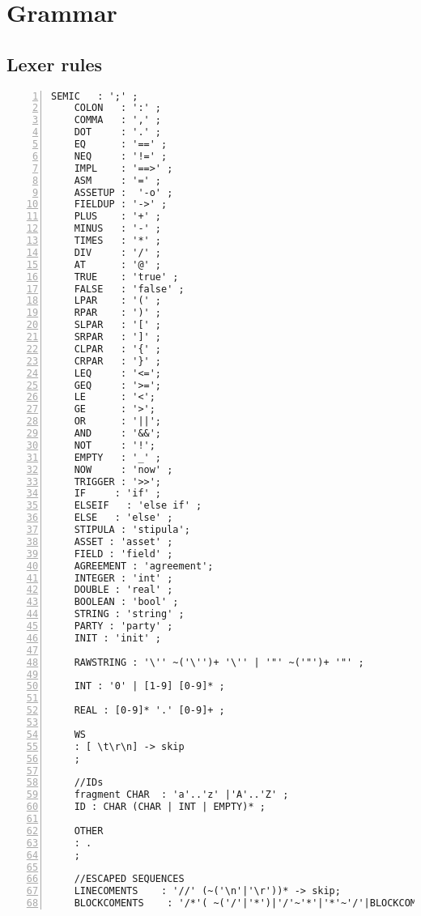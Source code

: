 
\chapter{Grammar}
\label{app:grammar}

\section{Lexer rules}
\begin{Verbatim}[numbers=left,xleftmargin=1cm,firstnumber=1,breaklines=true,breakanywhere=true,tabsize=2]
	SEMIC  	: ';' ;
	COLON  	: ':' ;
	COMMA  	: ',' ;
	DOT    	: '.' ;
	EQ     	: '==' ;
	NEQ     : '!=' ;
	IMPL   	: '==>' ;
	ASM    	: '=' ;
	ASSETUP :  '-o' ;
	FIELDUP : '->' ;
	PLUS   	: '+' ;
	MINUS  	: '-' ;
	TIMES  	: '*' ;
	DIV    	: '/' ;
	AT	   	: '@' ;
	TRUE   	: 'true' ;
	FALSE  	: 'false' ;
	LPAR   	: '(' ;
	RPAR   	: ')' ;
	SLPAR   : '[' ;
	SRPAR   : ']' ;
	CLPAR  	: '{' ;
	CRPAR  	: '}' ;
	LEQ		: '<=';
	GEQ		: '>=';
	LE		: '<';
	GE		: '>';
	OR		: '||';
	AND		: '&&';
	NOT		: '!';
	EMPTY 	: '_' ;
	NOW 	: 'now' ;
	TRIGGER : '>>';
	IF     : 'if' ;
	ELSEIF   : 'else if' ;
	ELSE   : 'else' ;
	STIPULA : 'stipula';
	ASSET : 'asset' ;
	FIELD : 'field' ;
	AGREEMENT : 'agreement';
	INTEGER : 'int' ;
	DOUBLE : 'real' ;
	BOOLEAN : 'bool' ;
	STRING : 'string' ;
	PARTY : 'party' ;
	INIT : 'init' ;

	RAWSTRING : '\'' ~('\'')+ '\'' | '"' ~('"')+ '"' ;

	INT : '0' | [1-9] [0-9]* ;

	REAL : [0-9]* '.' [0-9]+ ;

	WS
	: [ \t\r\n] -> skip
	;

	//IDs
	fragment CHAR  : 'a'..'z' |'A'..'Z' ;
	ID : CHAR (CHAR | INT | EMPTY)* ;

	OTHER
	: .
	;

	//ESCAPED SEQUENCES
	LINECOMENTS    : '//' (~('\n'|'\r'))* -> skip;
	BLOCKCOMENTS    : '/*'( ~('/'|'*')|'/'~'*'|'*'~'/'|BLOCKCOMENTS)* '*/' -> skip;
\end{Verbatim}

